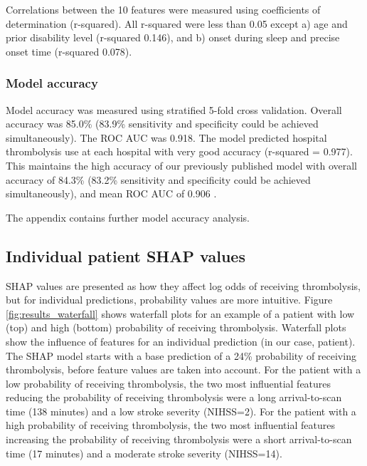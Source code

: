 Correlations between the 10 features were measured using coefficients of determination (r-squared). All r-squared were less than 0.05 except a) age and prior disability level (r-squared 0.146), and b) onset during sleep and precise onset time (r-squared 0.078).


\subsubsection{Model accuracy}


Model accuracy was measured using stratified 5-fold cross validation. Overall accuracy was 85.0\% (83.9\% sensitivity and specificity could be achieved simultaneously). The ROC AUC was 0.918. The model predicted hospital thrombolysis use at each hospital with very good accuracy (r-squared = 0.977). This maintains the high accuracy of our previously published model with overall accuracy of 84.3\% (83.2\% sensitivity and specificity could be achieved simultaneously), and mean ROC AUC of 0.906 \cite{allen_use_2022}.

The appendix contains further model accuracy analysis.

\subsection{Individual patient SHAP values}
SHAP values are presented as how they affect log odds of receiving thrombolysis, but for individual predictions, probability values are more intuitive. Figure \ref{fig:results_waterfall} shows waterfall plots for an example of a patient with low (top) and high (bottom) probability of receiving thrombolysis. Waterfall plots show the influence of features for an individual prediction (in our case, patient). The SHAP model starts with a base prediction of a 24\% probability of receiving thrombolysis, before feature values are taken into account. For the patient with a low probability of receiving thrombolysis, the two most influential features reducing the probability of receiving thrombolysis were a long arrival-to-scan time (138 minutes) and a low stroke severity (NIHSS=2). For the patient with a high probability of receiving thrombolysis, the two most influential features increasing the probability of receiving thrombolysis were a short arrival-to-scan time (17 minutes) and a moderate stroke severity (NIHSS=14). 

